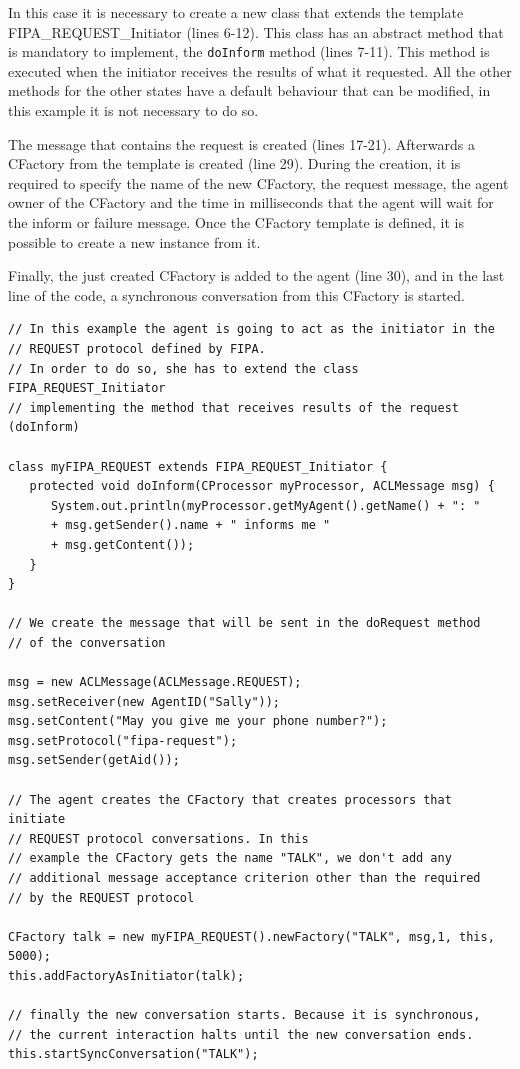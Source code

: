 In this case it is necessary to create a new class that extends the template FIPA\_REQUEST\_Ini\-tia\-tor (lines 6-12). This class has an abstract method that is mandatory to implement, the \texttt{doInform} method (lines 7-11). This method is executed when the initiator receives the results of what it requested. All the other methods for the other states have a default behaviour that can be modified, in this example it is not necessary to do so.

The message that contains the request is created (lines 17-21). Afterwards a CFactory from the template is created (line 29). During the creation, it is required to specify the name of the new CFactory, the request message, the agent owner of the CFactory and the time in milliseconds that the agent will wait for the inform or failure message. Once the CFactory template is defined, it is possible to create a new instance from it.

Finally, the just created CFactory is added to the agent (line 30), and in the last line of the code, a synchronous conversation from this CFactory is started.

\begin{lstlisting}[style=Java]
// In this example the agent is going to act as the initiator in the
// REQUEST protocol defined by FIPA.
// In order to do so, she has to extend the class FIPA_REQUEST_Initiator
// implementing the method that receives results of the request (doInform)

class myFIPA_REQUEST extends FIPA_REQUEST_Initiator {
   protected void doInform(CProcessor myProcessor, ACLMessage msg) {
      System.out.println(myProcessor.getMyAgent().getName() + ": "
      + msg.getSender().name + " informs me "
      + msg.getContent());
   }
}

// We create the message that will be sent in the doRequest method
// of the conversation

msg = new ACLMessage(ACLMessage.REQUEST);
msg.setReceiver(new AgentID("Sally"));
msg.setContent("May you give me your phone number?");
msg.setProtocol("fipa-request");
msg.setSender(getAid());

// The agent creates the CFactory that creates processors that initiate
// REQUEST protocol conversations. In this
// example the CFactory gets the name "TALK", we don't add any
// additional message acceptance criterion other than the required
// by the REQUEST protocol

CFactory talk = new myFIPA_REQUEST().newFactory("TALK", msg,1, this, 5000);
this.addFactoryAsInitiator(talk);

// finally the new conversation starts. Because it is synchronous,
// the current interaction halts until the new conversation ends.
this.startSyncConversation("TALK");
\end{lstlisting}


